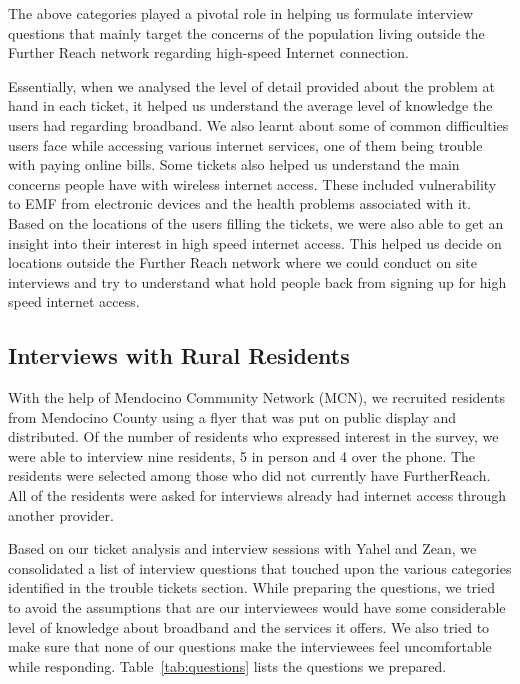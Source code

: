 The above categories played a pivotal role in helping us formulate interview questions that mainly target the concerns of the population living outside the Further Reach network regarding high-speed Internet connection.

Essentially, when we analysed the level of detail provided about the problem
at hand in each ticket, it helped us understand the average level of knowledge
the users had regarding broadband. We also learnt about some of common
difficulties users face while accessing various internet services, one of them
being trouble with paying online bills. Some tickets also helped us understand
the main concerns people have with wireless internet access. These included
vulnerability to EMF from electronic devices and the health problems
associated with it. Based on the locations of the users filling the tickets,
we were also able to get an insight into their interest in high speed internet
access. This helped us decide on locations outside the Further Reach network
where we could conduct on site interviews and try to understand what hold
people back from signing up for high speed internet access. 

\subsection{Interviews with Rural Residents}
\label{sec:interv-with-rural}

With the help of Mendocino Community Network (MCN), we recruited 
residents from Mendocino County using a flyer that was put on public display and distributed.
Of the number of residents who expressed interest in the survey, we were able to interview
nine residents, 5 in person and 4 over the phone. The residents were selected among those
who did not currently have FurtherReach. All of the residents were asked for interviews
already had internet access through another provider.

Based on our ticket analysis and interview sessions with Yahel and Zean, we consolidated a list of interview 
questions that touched upon the various categories identified in the trouble tickets section. While preparing
the questions, we tried to avoid the assumptions that are our interviewees would have some considerable level 
of knowledge about broadband and the services it offers. We also tried to make sure that none of our questions
make the interviewees feel uncomfortable while responding. Table~\ref{tab:questions} lists the questions
we prepared.

